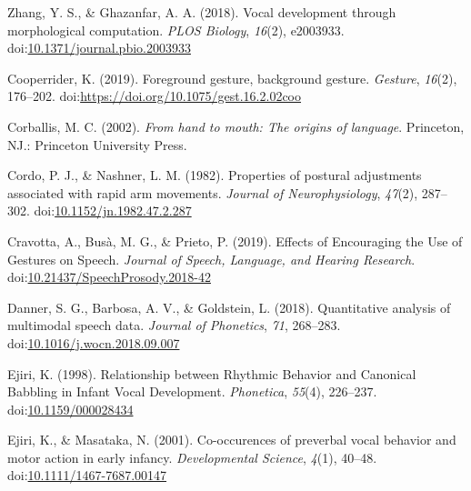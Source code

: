 \documentclass[
  man, noextraspace,floatsintext]{apa6}
\newlength{\cslhangindent}
\newenvironment{cslreferences}%
  {\setlength{\parindent}{0pt}%
  \everypar{\setlength{\hangindent}{\cslhangindent}}\ignorespaces}%
  {\par}
\begin{document}
\begin{cslreferences}
\leavevmode\hypertarget{ref-zhangVocalDevelopmentMorphological2018}{}%
Zhang, Y. S., \& Ghazanfar, A. A. (2018). Vocal development through morphological computation. \emph{PLOS Biology}, \emph{16}(2), e2003933. doi:\href{https://doi.org/10.1371/journal.pbio.2003933}{10.1371/journal.pbio.2003933}

\leavevmode\hypertarget{ref-cooperriderForegroundGestureBackground2019}{}%
Cooperrider, K. (2019). Foreground gesture, background gesture. \emph{Gesture}, \emph{16}(2), 176--202. doi:\href{https://doi.org/https://doi.org/10.1075/gest.16.2.02coo}{https://doi.org/10.1075/gest.16.2.02coo}

\leavevmode\hypertarget{ref-corballisHandMouthOrigins2002}{}%
Corballis, M. C. (2002). \emph{From hand to mouth: The origins of language}. Princeton, NJ.: Princeton University Press.

\leavevmode\hypertarget{ref-cordoPropertiesPosturalAdjustments1982}{}%
Cordo, P. J., \& Nashner, L. M. (1982). Properties of postural adjustments associated with rapid arm movements. \emph{Journal of Neurophysiology}, \emph{47}(2), 287--302. doi:\href{https://doi.org/10.1152/jn.1982.47.2.287}{10.1152/jn.1982.47.2.287}

\leavevmode\hypertarget{ref-cravottaEffectsEncouragingUse2019}{}%
Cravotta, A., Busà, M. G., \& Prieto, P. (2019). Effects of Encouraging the Use of Gestures on Speech. \emph{Journal of Speech, Language, and Hearing Research}. doi:\href{https://doi.org/10.21437/SpeechProsody.2018-42}{10.21437/SpeechProsody.2018-42}

\leavevmode\hypertarget{ref-dannerQuantitativeAnalysisMultimodal2018}{}%
Danner, S. G., Barbosa, A. V., \& Goldstein, L. (2018). Quantitative analysis of multimodal speech data. \emph{Journal of Phonetics}, \emph{71}, 268--283. doi:\href{https://doi.org/10.1016/j.wocn.2018.09.007}{10.1016/j.wocn.2018.09.007}

\leavevmode\hypertarget{ref-ejiriRelationshipRhythmicBehavior1998}{}%
Ejiri, K. (1998). Relationship between Rhythmic Behavior and Canonical Babbling in Infant Vocal Development. \emph{Phonetica}, \emph{55}(4), 226--237. doi:\href{https://doi.org/10.1159/000028434}{10.1159/000028434}

\leavevmode\hypertarget{ref-ejiriCooccurencesPreverbalVocal2001}{}%
Ejiri, K., \& Masataka, N. (2001). Co-occurences of preverbal vocal behavior and motor action in early infancy. \emph{Developmental Science}, \emph{4}(1), 40--48. doi:\href{https://doi.org/10.1111/1467-7687.00147}{10.1111/1467-7687.00147}


\end{cslreferences}
\end{document}

